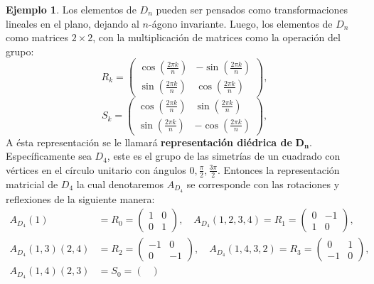 \documentclass[12pt]{book}
\theoremstyle{definition}
\newtheorem{example}[theorem]{Ejemplo}
\newcounter{in}
\begin{document}
\begin{example}
Los elementos de $D_{n}$ pueden ser pensados como transformaciones
lineales en el plano, dejando al $n$-ágono invariante. Luego, los
elementos de $D_{n}$ como matrices $2 \times 2$, con la multiplicación
de matrices como la operación del grupo:
\begin{equation*} 
R_{k} = \begin{pmatrix}
    \cos(\frac{2 \pi k}{n}) & - \sin(\frac{2 \pi k}{n}) \\
    \sin(\frac{2 \pi k}{n}) & \cos(\frac{2 \pi k}{n})
  \end{pmatrix},
\end{equation*}
\begin{equation*} 
S_{k} =  \begin{pmatrix}
    \cos(\frac{2 \pi k}{n}) &  \sin(\frac{2 \pi k}{n}) \\
    \sin(\frac{2 \pi k}{n}) & - \cos(\frac{2 \pi k}{n})
  \end{pmatrix},
\end{equation*}
A ésta representación se le llamará \textbf{representación diédrica
de} $\mathbf{D_{n}}$.  Específicamente sea $D_{4}$, este es el grupo
de las simetrías de un cuadrado con vértices en el círculo unitario
con ángulos $0, \frac{\pi}{2}, \frac{3 \pi}{2}$.  Entonces la
representación matricial de $D_{4}$ la cual denotaremos $A_{D_{4}}$ se corresponde con las rotaciones y reflexiones de la siguiente manera:
\begin{equation*}
\begin{aligned}
A_{D_{4}}(1) & = R_{0} = \begin{pmatrix}
    1 & 0 \\
    0 & 1
    \end{pmatrix}, \quad
A_{D_{4}}(1, 2, 3, 4) = R_{1} = \begin{pmatrix}
    0 & -1 \\
    1 & 0
    \end{pmatrix}, \quad \\
A_{D_{4}}(1, 3)(2, 4) & = R_{2} = \begin{pmatrix}
    -1 & 0 \\
    0 & -1
    \end{pmatrix}, \quad 
A_{D_{4}}(1, 4, 3 ,2)  = R_{3} = \begin{pmatrix}
    0 & 1 \\
    -1 & 0
    \end{pmatrix}, \quad \\
A_{D_{4}}(1, 4)(2, 3) & = S_{0} = \begin{pmatrix}

\end{pmatrix}
\end{aligned}
\end{equation*}
\end{example}
\end{document}
